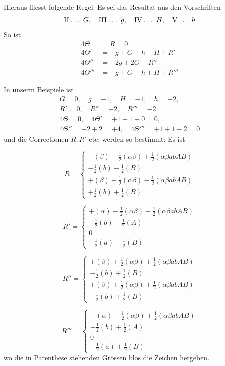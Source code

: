 %
Hieraus fliesst folgende Regel. Es sei das Resultat aus den Vorschriften
\[
\mathrm{II}\mathbin{.}\mathbin{.}\mathbin{.}\;G,\quad
\mathrm{III}\mathbin{.}\mathbin{.}\mathbin{.}\;g,\quad
\mathrm{IV}\mathbin{.}\mathbin{.}\mathbin{.}\;H,\quad
\mathrm{V}\mathbin{.}\mathbin{.}\mathbin{.}\;h
\]
So ist
\[
\begin{aligned}
4\Theta&=R=0\\
4\Theta'&=-g+G-h-H+R'\\
4\Theta''&=-2g+2G+R''\\
4\Theta'''&=-g+G+h+H+R'''
\end{aligned}
\]

In unserm Beispiele ist
\[
\begin{gathered}
G=0,\quad g=-1,\quad H=-1,\quad h=+2,\\
R'=0,\quad R''=+2,\quad R'''=-2\\
4\Theta=0,\quad4\Theta'=+1-1+0=0,\\
4\Theta''=+2+2=+4,\quad4\Theta'''=+1+1-2=0
\end{gathered}
\]
und die Correctionen $R,R'$ etc. werden so bestimmt: Es ist

\[
R=\left\{\begin{array}{l}
-(\beta)+\frac12(\alpha\beta)+\frac12(\alpha\beta abAB)\\
-\frac12(b)-\frac12(B)\\
+(\beta)-\frac12(\alpha\beta)-\frac12(\alpha\beta abAB)\\
+\frac12(b)+\frac12(B)
\end{array}\right.
\]

\[
R'=\left\{\begin{array}{l}
+(\alpha)-\frac12(\alpha\beta)+\frac12(\alpha\beta abAB)\\
-\frac12(b)-\frac12(A)\\
0\\
-\frac12(a)+\frac12(B)
\end{array}\right.
\]

\[
R''=\left\{\begin{array}{l}
+(\beta)+\frac12(\alpha\beta)+\frac12(\alpha\beta abAB)\\
-\frac12(b)+\frac12(B)\\
+(\beta)+\frac12(\alpha\beta)+\frac12(\alpha\beta abAB)\\
-\frac12(b)+\frac12(B)
\end{array}\right.
\]

\[
R'''=\left\{\begin{array}{l}
-(\alpha)-\frac12(\alpha\beta)+\frac12(\alpha\beta abAB)\\
-\frac12(b)+\frac12(A)\\
0\\
+\frac12(a)+\frac12(B)
\end{array}\right.
\]
wo die in Parenthese stehenden Grössen blos die Zeichen hergeben.

